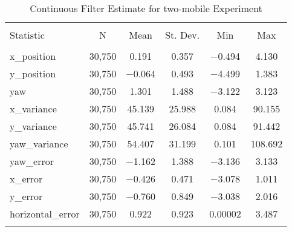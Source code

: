 
\begin{table}[h] \centering 
  \caption{Continuous Filter Estimate for two-mobile Experiment} 
  \label{tab:two_mobile_continuous_summary} 
\begin{tabular}{@{\extracolsep{5pt}}lccccc} 
\\[-1.8ex]\hline 
\hline \\[-1.8ex] 
Statistic & \multicolumn{1}{c}{N} & \multicolumn{1}{c}{Mean} & \multicolumn{1}{c}{St. Dev.} & \multicolumn{1}{c}{Min} & \multicolumn{1}{c}{Max} \\ 
\hline \\[-1.8ex] 
x\_position & 30,750 & 0.191 & 0.357 & $-$0.494 & 4.130 \\ 
y\_position & 30,750 & $-$0.064 & 0.493 & $-$4.499 & 1.383 \\ 
yaw & 30,750 & 1.301 & 1.488 & $-$3.122 & 3.123 \\ 
x\_variance & 30,750 & 45.139 & 25.988 & 0.084 & 90.155 \\ 
y\_variance & 30,750 & 45.741 & 26.084 & 0.084 & 91.442 \\ 
yaw\_variance & 30,750 & 54.407 & 31.199 & 0.101 & 108.692 \\ 
yaw\_error & 30,750 & $-$1.162 & 1.388 & $-$3.136 & 3.133 \\ 
x\_error & 30,750 & $-$0.426 & 0.471 & $-$3.078 & 1.011 \\ 
y\_error & 30,750 & $-$0.760 & 0.849 & $-$3.038 & 2.016 \\ 
horizontal\_error & 30,750 & 0.922 & 0.923 & 0.00002 & 3.487 \\ 
\hline \\[-1.8ex] 
\end{tabular} 
\end{table} 
